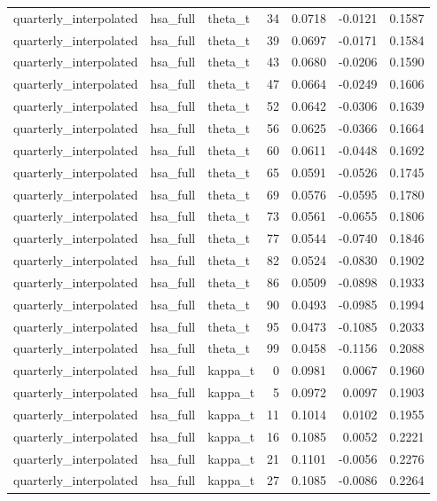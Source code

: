 \begin{tabular}{lllrrrr}
quarterly\_interpolated & hsa\_full & theta\_t & 34 & 0.0718 & -0.0121 & 0.1587 \\
quarterly\_interpolated & hsa\_full & theta\_t & 39 & 0.0697 & -0.0171 & 0.1584 \\
quarterly\_interpolated & hsa\_full & theta\_t & 43 & 0.0680 & -0.0206 & 0.1590 \\
quarterly\_interpolated & hsa\_full & theta\_t & 47 & 0.0664 & -0.0249 & 0.1606 \\
quarterly\_interpolated & hsa\_full & theta\_t & 52 & 0.0642 & -0.0306 & 0.1639 \\
quarterly\_interpolated & hsa\_full & theta\_t & 56 & 0.0625 & -0.0366 & 0.1664 \\
quarterly\_interpolated & hsa\_full & theta\_t & 60 & 0.0611 & -0.0448 & 0.1692 \\
quarterly\_interpolated & hsa\_full & theta\_t & 65 & 0.0591 & -0.0526 & 0.1745 \\
quarterly\_interpolated & hsa\_full & theta\_t & 69 & 0.0576 & -0.0595 & 0.1780 \\
quarterly\_interpolated & hsa\_full & theta\_t & 73 & 0.0561 & -0.0655 & 0.1806 \\
quarterly\_interpolated & hsa\_full & theta\_t & 77 & 0.0544 & -0.0740 & 0.1846 \\
quarterly\_interpolated & hsa\_full & theta\_t & 82 & 0.0524 & -0.0830 & 0.1902 \\
quarterly\_interpolated & hsa\_full & theta\_t & 86 & 0.0509 & -0.0898 & 0.1933 \\
quarterly\_interpolated & hsa\_full & theta\_t & 90 & 0.0493 & -0.0985 & 0.1994 \\
quarterly\_interpolated & hsa\_full & theta\_t & 95 & 0.0473 & -0.1085 & 0.2033 \\
quarterly\_interpolated & hsa\_full & theta\_t & 99 & 0.0458 & -0.1156 & 0.2088 \\
quarterly\_interpolated & hsa\_full & kappa\_t & 0 & 0.0981 & 0.0067 & 0.1960 \\
quarterly\_interpolated & hsa\_full & kappa\_t & 5 & 0.0972 & 0.0097 & 0.1903 \\
quarterly\_interpolated & hsa\_full & kappa\_t & 11 & 0.1014 & 0.0102 & 0.1955 \\
quarterly\_interpolated & hsa\_full & kappa\_t & 16 & 0.1085 & 0.0052 & 0.2221 \\
quarterly\_interpolated & hsa\_full & kappa\_t & 21 & 0.1101 & -0.0056 & 0.2276 \\
quarterly\_interpolated & hsa\_full & kappa\_t & 27 & 0.1085 & -0.0086 & 0.2264 \\

\end{tabular}
